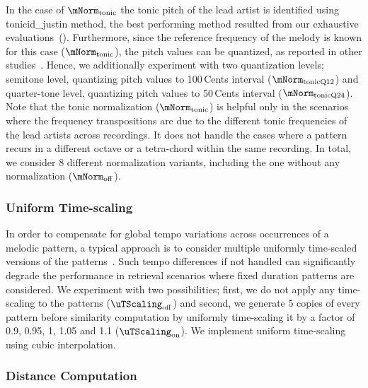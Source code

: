 In the case of $\mNorm_{\mathrm{tonic}}$ the tonic pitch of the lead artist is identified using \acrshort{tonicid_justin} method, the best performing method resulted from our exhaustive evaluations~(). Furthermore, since the reference frequency of the melody is known for this case ($\mNorm_{\mathrm{tonic}}$), the pitch values can be quantized, as reported in other studies~\citep{Ross2012b}. Hence, we additionally experiment with two quantization levels; semitone level, quantizing pitch values to 100\,Cents interval ($\mNorm_{\mathrm{tonicQ12}}$) and quarter-tone level, quantizing pitch values to 50\,Cents interval ($\mNorm_{\mathrm{tonicQ24}}$). Note that the tonic normalization ($\mNorm_{\mathrm{tonic}}$) is helpful only in the scenarios where the frequency transpositions are due to the different tonic frequencies of the lead artists across recordings. It does not handle the cases where a pattern recurs in a different octave or a tetra-chord within the same recording. In total, we consider 8 different normalization variants, including the one without any normalization ($\mNorm_{\mathrm{off}}$). 


\subsubsection{Uniform Time-scaling}
\label{sec:patterns_melodic_similarity_time_scaling}

In order to compensate for global tempo variations across occurrences of a melodic pattern, a typical approach is to consider multiple uniformly time-scaled versions of the patterns~\citep{mazzoni2001melody,zhu2003query,kotsifakos2012survey}. Such tempo differences if not handled can significantly degrade the performance in retrieval scenarios where fixed duration patterns are considered. We experiment with two possibilities; first, we do not apply any time-scaling to the patterns ($\uTScaling_{\mathrm{off}}$) and second, we generate 5 copies of every pattern before similarity computation by uniformly time-scaling it by a factor of 0.9, 0.95, 1, 1.05 and 1.1 ($\uTScaling_{\mathrm{on}}$). We implement uniform time-scaling using cubic interpolation. 


\subsubsection{Distance Computation}
\label{sec:patterns_melodic_similarity_dissimilarity measures}

